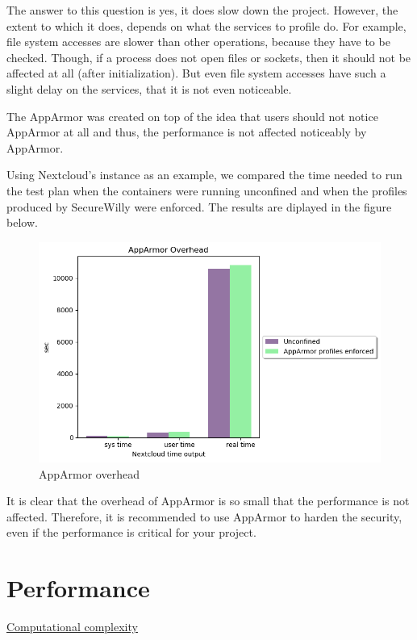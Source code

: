 The answer to this question is yes, it does slow down the project. However, the extent to which it does, depends on what the services to profile do. For example, file system accesses are slower than other operations, because they have to be checked. Though, if a process does not open files or sockets, then it should not be affected at all (after initialization). But even file system accesses have such a slight delay on the services, that it is not even noticeable.

The AppArmor was created on top of the idea that users should not notice AppArmor at all and thus, the performance is not affected noticeably by AppArmor.

Using Nextcloud's instance as an example, we compared the time needed to run the test plan when the containers were running unconfined and when the profiles produced by SecureWilly were enforced. The results are diplayed in the figure below.

\begin{figure}[h!]
  \centering
   \includegraphics[width=1\linewidth]{figures/overhead.png}
   \caption{AppArmor overhead}
\end{figure}

It is clear that the overhead of AppArmor is so small that the performance is not affected. Therefore, it is recommended to use AppArmor to harden the security, even if the performance is critical for your project.

\clearpage
\section{Performance}

\underline{Computational complexity}
\hfill\break

